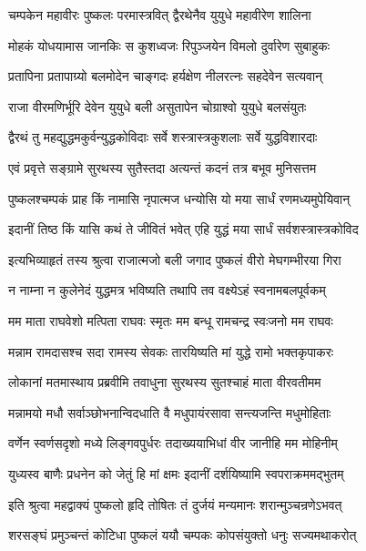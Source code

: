 \twolineshloka
{चम्पकेन महावीरः पुष्कलः परमास्त्रवित्}
{द्वैरथेनैव युयुधे महावीरेण शालिना}%

\twolineshloka
{मोहकं योधयामास जानकिः स कुशध्वजः}
{रिपुञ्जयेन विमलो दुर्वारेण सुबाहुकः}%

\twolineshloka
{प्रतापिना प्रतापाग्र्यो बलमोदेन चाङ्गदः}
{हर्यक्षेण नीलरत्नः सहदेवेन सत्यवान्}%

\twolineshloka
{राजा वीरमणिर्भूरि देवेन युयुधे बली}
{असुतापेन चोग्राश्वो युयुधे बलसंयुतः}%

\twolineshloka
{द्वैरथं तु महद्युद्धमकुर्वन्युद्धकोविदाः}
{सर्वे शस्त्रास्त्रकुशलाः सर्वे युद्धविशारदाः}%

\twolineshloka
{एवं प्रवृत्ते सङ्ग्रामे सुरथस्य सुतैस्तदा}
{अत्यन्तं कदनं तत्र बभूव मुनिसत्तम}%

\twolineshloka
{पुष्कलश्चम्पकं प्राह किं नामासि नृपात्मज}
{धन्योसि यो मया सार्धं रणमध्यमुपेयिवान्}%

\twolineshloka
{इदानीं तिष्ठ किं यासि कथं ते जीवितं भवेत्}
{एहि युद्धं मया सार्धं सर्वशस्त्रास्त्रकोविद}%

\twolineshloka
{इत्यभिव्याहृतं तस्य श्रुत्वा राजात्मजो बली}
{जगाद पुष्कलं वीरो मेघगम्भीरया गिरा}%


\twolineshloka
{न नाम्ना न कुलेनेदं युद्धमत्र भविष्यति}
{तथापि तव वक्ष्येऽहं स्वनामबलपूर्वकम्}%

\twolineshloka
{मम माता राघवेशो मत्पिता राघवः स्मृतः}
{मम बन्धू रामचन्द्र स्वःजनो मम राघवः}%

\twolineshloka
{मन्नाम रामदासश्च सदा रामस्य सेवकः}
{तारयिष्यति मां युद्धे रामो भक्तकृपाकरः}%

\twolineshloka
{लोकानां मतमास्थाय प्रब्रवीमि तवाधुना}
{सुरथस्य सुतश्चाहं माता वीरवतीमम}%

\twolineshloka
{मन्नामयो मधौ सर्वाञ्छोभनान्विदधाति वै}
{मधुपायंरसावा सन्त्यजन्ति मधुमोहिताः}%

\twolineshloka
{वर्णेन स्वर्णसदृशो मध्ये लिङ्गवपुर्धरः}
{तदाख्ययाभिधां वीर जानीहि मम मोहिनीम्}%

\twolineshloka
{युध्यस्व बाणैः प्रधनेन को जेतुं हि मां क्षमः}
{इदानीं दर्शयिष्यामि स्वपराक्रममद्भुतम्}%


\twolineshloka
{इति श्रुत्वा महद्वाक्यं पुष्कलो हृदि तोषितः}
{तं दुर्जयं मन्यमानः शरान्मुञ्चन्रणेऽभवत्}%

\twolineshloka
{शरसङ्घं प्रमुञ्चन्तं कोटिधा पुष्कलं ययौ}
{चम्पकः कोपसंयुक्तो धनुः सज्यमथाकरोत्}%

